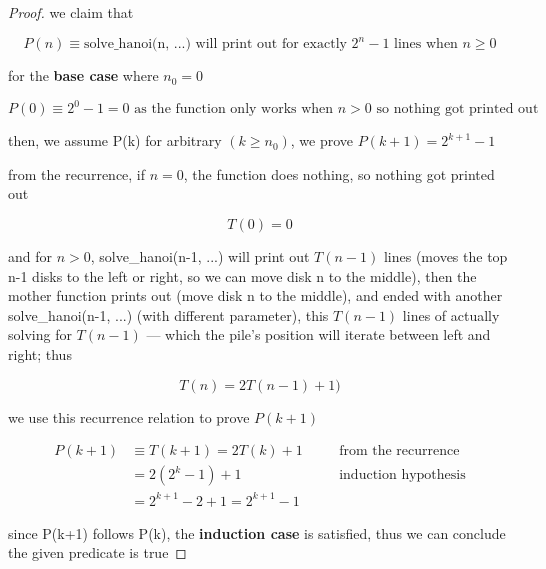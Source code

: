 \documentclass{article}
\theoremstyle{remark}
\begin{document}
\begin{proof}

    we claim that

    \[
        P(n) \equiv \text{solve\_hanoi(n, ...) will print out for exactly } 2^n - 1 \text{ lines when } n \ge 0
    \]

    for the \textbf{base case} where $n_0 = 0$

    \[
        P(0) \equiv 2^0 - 1 = 0 \text{ as the function only works when } n > 0 \text{ so nothing got printed out}
    \]

    then, we assume P(k) for arbitrary $(k \ge n_0)$, we prove $P(k+1) = 2^{k+1} - 1$

    \vspace{1em}

    from the recurrence, if $n = 0$, the function does nothing, so nothing got printed out

    \[T(0) = 0\]

    and for $n > 0$, solve\_hanoi(n-1, ...) will print out $T(n-1)$ lines (moves the top n-1 disks to the left or right, so we can move disk n to the middle), then the mother function prints out (move disk n to the middle), and ended with another solve\_hanoi(n-1, ...) (with different parameter), this $T(n-1)$ lines of actually solving for $T(n-1)$ --- which the pile's position will iterate between left and right; thus

    \[T(n) = 2T(n-1) + 1)\]

    we use this recurrence relation to prove $P(k+1)$

    \begin{align*}
        P(k+1) &\equiv T(k+1) = 2T(k) + 1 && \quad \text{from the recurrence}\\
        &= 2(2^k-1) + 1 && \quad \text{induction hypothesis} \\
        &= 2^{k+1} - 2 + 1 = 2^{k+1} - 1
    \end{align*}

    since P(k+1) follows P(k), the \textbf{induction case} is satisfied, thus we can conclude the given predicate is true

\end{proof}
\end{document}
